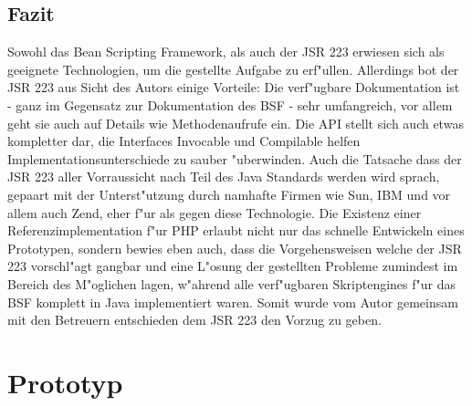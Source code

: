\subsection{Fazit}
\label{sec:chap1:ana:fazit}

Sowohl das Bean Scripting Framework, als auch der JSR 223 erwiesen sich als geeignete Technologien, um die gestellte Aufgabe zu 
erf"ullen. Allerdings bot der JSR 223 aus Sicht des Autors einige Vorteile: 
Die verf"ugbare Dokumentation ist - ganz im Gegensatz zur Dokumentation des BSF - sehr umfangreich, vor allem geht sie auch
auf Details wie Methodenaufrufe ein. Die API stellt sich auch etwas kompletter dar, die Interfaces Invocable und Compilable 
helfen Implementationsunterschiede zu sauber "uberwinden. Auch die Tatsache dass der JSR 223 aller Vorraussicht nach Teil
des Java Standards werden wird sprach, gepaart mit der Unterst"utzung durch namhafte Firmen wie Sun, IBM und vor allem auch 
Zend, eher f"ur als gegen diese Technologie. Die Existenz einer Referenzimplementation f"ur PHP erlaubt nicht nur das
schnelle Entwickeln eines Prototypen, sondern bewies eben auch, dass die Vorgehensweisen welche der JSR 223 vorschl"agt 
gangbar und eine L"osung der gestellten Probleme zumindest im Bereich des M"oglichen lagen, w"ahrend alle verf"ugbaren
Skriptengines f"ur das BSF komplett in Java implementiert waren.
Somit wurde vom Autor gemeinsam mit den Betreuern entschieden dem JSR 223 den Vorzug zu geben.

\section{Prototyp}
\label{sec:chap1:prototype}

